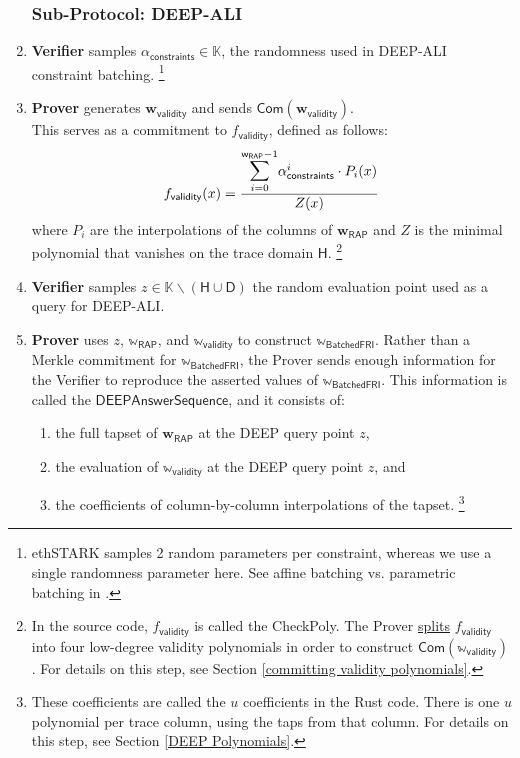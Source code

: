\documentclass[10pt,letterpaper,titlepage]{article}
\theoremstyle{definition}
\begin{document}
\begin{enumerate}
  \subsubsection{Sub-Protocol: DEEP-ALI}
  \item \textbf{Verifier} samples $\alpha_\mathsf{constraints}\in\mathbb{K}$, the randomness used in DEEP-ALI constraint batching.%
  \footnote{ethSTARK samples 2 random parameters per constraint, whereas we use a single randomness parameter here. See affine batching vs. parametric batching in \cite{FRIsummary}.}
  \item \textbf{Prover} generates $\mathbf{w}_\mathsf{validity}$ and sends $\mathsf{Com}(\mathbf{w}_\mathsf{validity})$. \\
  This serves as a commitment to $f_\mathsf{validity}$, defined as follows:
  \[
    f_\mathsf{validity}(x)=
    \frac{
      \mathlarger{
        \mathlarger{\sum}}_{i=0}^{
          \mathsf{w}_\mathsf{RAP}-1
          }
          \alpha_\mathsf{constraints}^i\cdot P_i(x)}
      {Z(x)}
  \] 
  where $P_i$ are the interpolations of the columns of $\mathbf{w}_\mathsf{RAP}$ and $Z$ is the minimal polynomial that vanishes on the trace domain $\mathsf{H}$.%
  \footnote{
    In the source code, $f_\mathsf{validity}$ is called the CheckPoly. The Prover \hyperref[split]{splits} $f_\mathsf{validity}$ into four low-degree validity polynomials in order to construct $\mathsf{Com}(\mathbb{w}_\mathsf{validity})$. 
    For details on this step, see Section \ref{committing validity polynomials}.
    }
  \item \textbf{Verifier} samples $z\in\mathbb{K}\backslash(\mathsf{H}\cup\mathsf{D})$ the random evaluation point used as a query for DEEP-ALI. 
  \item \textbf{Prover} uses $z$, $\mathbb{w}_\mathsf{RAP}$, and $\mathbb{w}_\mathsf{validity}$ to construct $\mathbb{w}_\mathsf{BatchedFRI}$. 
  Rather than a Merkle commitment for $\mathbb{w}_\mathsf{BatchedFRI}$, the Prover sends enough information for the Verifier to reproduce the asserted values of $\mathbb{w}_\mathsf{BatchedFRI}$. 
  This information is called the $\mathsf{DEEPAnswerSequence}$, and it consists of: 
  \begin{enumerate}
    \item the full tapset of $\mathbf{w}_\mathsf{RAP}$ at the DEEP query point $z$, 
    \item the evaluation of $\mathbb{w}_\mathsf{validity}$ at the DEEP query point $z$, and 
    \item the coefficients of column-by-column interpolations of the tapset.%
    \footnote{
      These coefficients are called the $u$ coefficients in the Rust code. 
      There is one $u$ polynomial per trace column, using the taps from that column.
      For details on this step, see Section \ref{DEEP Polynomials}.
      }
  \end{enumerate}

\end{enumerate}
\end{document}
